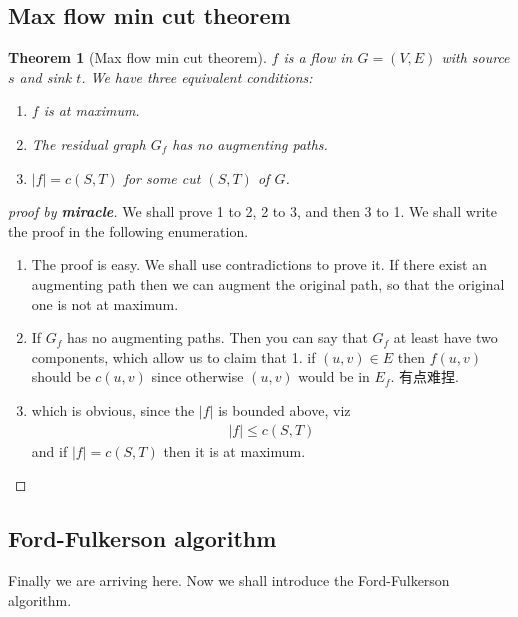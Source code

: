 \documentclass[a4paper, 10pt]{ctexart} %
\newtheorem{theorem}{Theorem}
\begin{document}
\subsection{Max flow min cut theorem}
\begin{theorem}[Max flow min cut theorem]
$f$ is a flow in $G = \left(V ,E\right)$ with source $s$ and sink 
$t$. We have three equivalent conditions:
\begin{enumerate}
    \item $f$ is at maximum.
    \item The residual graph $G_{f}$ has no augmenting paths.
    \item $\left| f \right| =  c\left(S,  T\right) $ for some cut
    $ \left( S , T\right) $ of $G$.
\end{enumerate}
\end{theorem}
\begin{proof}[proof by {\bfseries miracle}] We shall
    prove 1 to 2, 2 to 3, and then 3 to 1. We 
    shall write the proof in 
    the following enumeration.
    \begin{enumerate}
        \item[1 to 2:] The proof is easy. We shall use 
        contradictions to prove it. If there exist 
        an augmenting path then we can augment the 
        original path, so that the original one is not at 
        maximum. 
        \item[2 to 3:] If $G_{f}$ has no augmenting paths. 
        Then you can say that 
        $G_{f}$ at least have two 
        components, which allow us to 
        claim that 1. if $\left( u ,v\right) \in E$
        then $f \left( u ,v\right) $ should be $c \left( u ,v\right)$ 
        since otherwise $ \left(u, v\right)$ would be 
        in $E_{f}$. 有点难捏.
        \item[3 to 1:] which is obvious, since the
        $\left| f \right|  $ is bounded above, viz
        \begin{align*}
            \left| f \right|  \le c \left(S ,T\right) 
        \end{align*}
        and if $\left| f \right|  = c \left(S ,T\right)$ then it 
        is at maximum.
    \end{enumerate}
\end{proof}

\subsection{Ford-Fulkerson algorithm}
Finally we are arriving here. Now we shall 
introduce the Ford-Fulkerson algorithm. 
\end{document}
